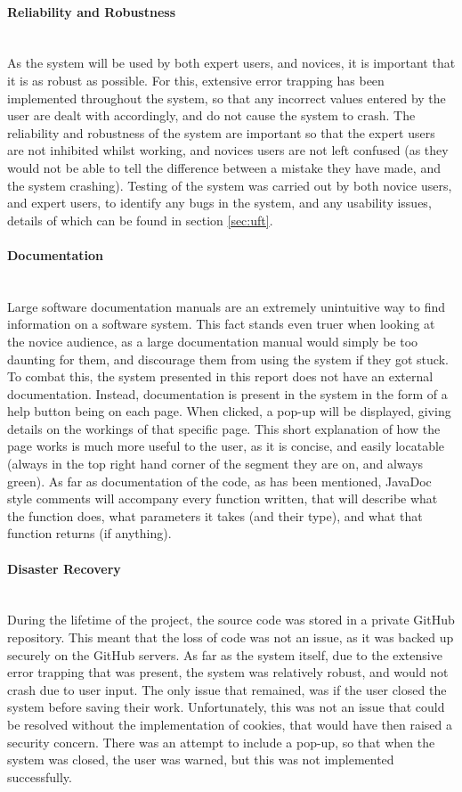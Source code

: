 \paragraph{Reliability and Robustness}\ \\
As the system will be used by both expert users, and novices, it is important that it is as robust as possible. For this, extensive error trapping has been implemented throughout the system, so that any incorrect values entered by the user are dealt with accordingly, and do not cause the system to crash. The reliability and robustness of the system are important so that the expert users are not inhibited whilst working, and novices users are not left confused (as they would not be able to tell the difference between a mistake they have made, and the system crashing). Testing of the system was carried out by both novice users, and expert users, to identify any bugs in the system, and any usability issues, details of which can be found in section \ref{sec:uft}.

\paragraph{Documentation}\ \\
Large software documentation manuals are an extremely unintuitive way to find information on a software system. This fact stands even truer when looking at the novice audience, as a large documentation manual would simply be too daunting for them, and discourage them from using the system if they got stuck. To combat this, the system presented in this report does not have an external documentation. Instead, documentation is present in the system in the form of a help button being on each page. When clicked, a pop-up will be displayed, giving details on the workings of that specific page. This short explanation of how the page works is much more useful to the user, as it is concise, and easily locatable (always in the top right hand corner of the segment they are on, and always green). As far as documentation of the code, as has been mentioned, JavaDoc style comments will accompany every function written, that will describe what the function does, what parameters it takes (and their type), and what that function returns (if anything). 

\paragraph{Disaster Recovery}\ \\
During the lifetime of the project, the source code was stored in a private GitHub repository. This meant that the loss of code was not an issue, as it was backed up securely on the GitHub servers. As far as the system itself, due to the extensive error trapping that was present, the system was relatively robust, and would not crash due to user input. The only issue that remained, was if the user closed the system before saving their work. Unfortunately, this was not an issue that could be resolved without the implementation of cookies, that would have then raised a security concern. There was an attempt to include a pop-up, so that when the system was closed, the user was warned, but this was not implemented successfully. 

